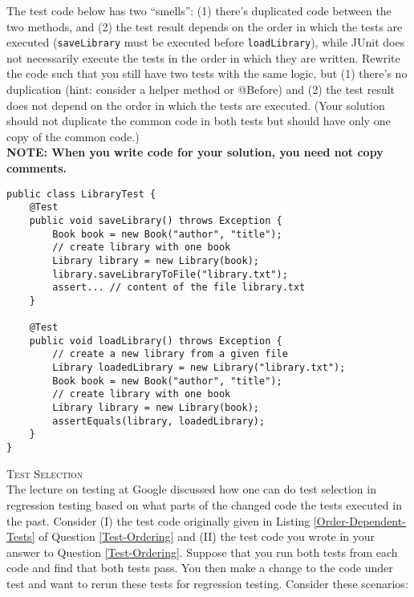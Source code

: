 \documentclass[11pt]{exam}
\begin{document}
\begin{questions}
\begin{parts}
The test code below has two ``smells'': (1) there's duplicated code
between the two methods, and (2) the test result depends on the order
in which the tests are executed (\texttt{saveLibrary} must be executed
before \texttt{loadLibrary}), while JUnit does not necessarily execute
the tests in the order in which they are written.  Rewrite the code
such that you still have two tests with the same logic, but (1)
there's no duplication (hint: consider a helper method or @Before) and
(2) the test result does not depend on the order in which the tests
are executed.  (Your solution should not duplicate the common code in
both tests but should have only one copy of the common code.)\\

\textbf{NOTE: When you write code for your solution, you need not copy comments.}\\

\begin{lstlisting}[caption={Order-Dependent Tests}, label=Order-Dependent-Tests]
public class LibraryTest {
    @Test
    public void saveLibrary() throws Exception {
        Book book = new Book("author", "title");
        // create library with one book
        Library library = new Library(book);
        library.saveLibraryToFile("library.txt");
        assert... // content of the file library.txt
    }

    @Test
    public void loadLibrary() throws Exception {       
        // create a new library from a given file
        Library loadedLibrary = new Library("library.txt");
        Book book = new Book("author", "title");
        // create library with one book
        Library library = new Library(book);
        assertEquals(library, loadedLibrary);
    }
}
\end{lstlisting}
  \begin{solution}[4 in]
  \end{solution}
\end{parts}

\newpage

\question \textsc{Test Selection} \\
The lecture on testing at Google discussed how one can do test 
selection in regression testing based on what parts of the changed code 
the tests executed in the past.  Consider (I) the test code originally 
given in Listing \ref{Order-Dependent-Tests} of Question \ref{Test-Ordering} 
and (II) the test code you wrote in your answer to Question \ref{Test-Ordering}. 
Suppose that you run both tests from each code and find 
that both tests pass.  You then make a change to the code under test 
and want to rerun these tests for regression testing.  Consider these 
scenarios:
\begin{parts}


\end{parts}
\end{questions}
\end{document}

